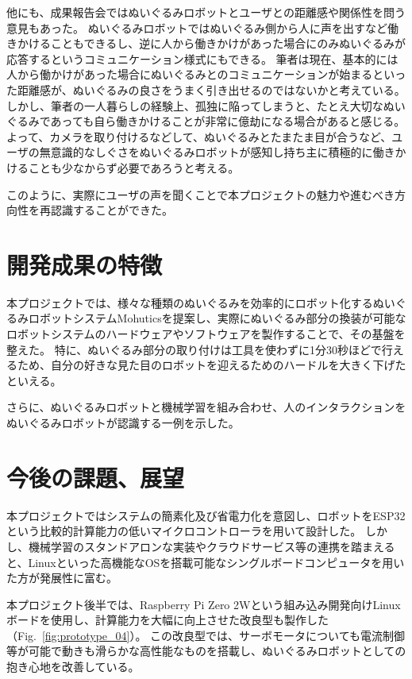 \documentclass[uplatex,a4paper,12pt]{jsarticle}
\renewcommand{\figurename}{Fig.}
\newcommand{\figref}[1]{\figurename~\ref{#1}}
\begin{document}
他にも、成果報告会ではぬいぐるみロボットとユーザとの距離感や関係性を問う意見もあった。
ぬいぐるみロボットではぬいぐるみ側から人に声を出すなど働きかけることもできるし、逆に人から働きかけがあった場合にのみぬいぐるみが応答するというコミュニケーション様式にもできる。
筆者は現在、基本的には人から働かけがあった場合にぬいぐるみとのコミュニケーションが始まるといった距離感が、ぬいぐるみの良さをうまく引き出せるのではないかと考えている。
しかし、筆者の一人暮らしの経験上、孤独に陥ってしまうと、たとえ大切なぬいぐるみであっても自ら働きかけることが非常に億劫になる場合があると感じる。
よって、カメラを取り付けるなどして、ぬいぐるみとたまたま目が合うなど、ユーザの無意識的なしぐさをぬいぐるみロボットが感知し持ち主に積極的に働きかけることも少なからず必要であろうと考える。

このように、実際にユーザの声を聞くことで本プロジェクトの魅力や進むべき方向性を再認識することができた。

\section{開発成果の特徴}
本プロジェクトでは、様々な種類のぬいぐるみを効率的にロボット化するぬいぐるみロボットシステムMohuticsを提案し、実際にぬいぐるみ部分の換装が可能なロボットシステムのハードウェアやソフトウェアを製作することで、その基盤を整えた。
特に、ぬいぐるみ部分の取り付けは工具を使わずに1分30秒ほどで行えるため、自分の好きな見た目のロボットを迎えるためのハードルを大きく下げたといえる。

さらに、ぬいぐるみロボットと機械学習を組み合わせ、人のインタラクションをぬいぐるみロボットが認識する一例を示した。


\section{今後の課題、展望}\label{sec:challenges}
本プロジェクトではシステムの簡素化及び省電力化を意図し、ロボットをESP32という比較的計算能力の低いマイクロコントローラを用いて設計した。
しかし、機械学習のスタンドアロンな実装やクラウドサービス等の連携を踏まえると、Linuxといった高機能なOSを搭載可能なシングルボードコンピュータを用いた方が発展性に富む。

本プロジェクト後半では、Raspberry Pi Zero 2Wという組み込み開発向けLinuxボードを使用し、計算能力を大幅に向上させた改良型も製作した（\figref{fig:prototype_04}）。
この改良型では、サーボモータについても電流制御等が可能で動きも滑らかな高性能なものを搭載し、ぬいぐるみロボットとしての抱き心地を改善している。
\end{document}
